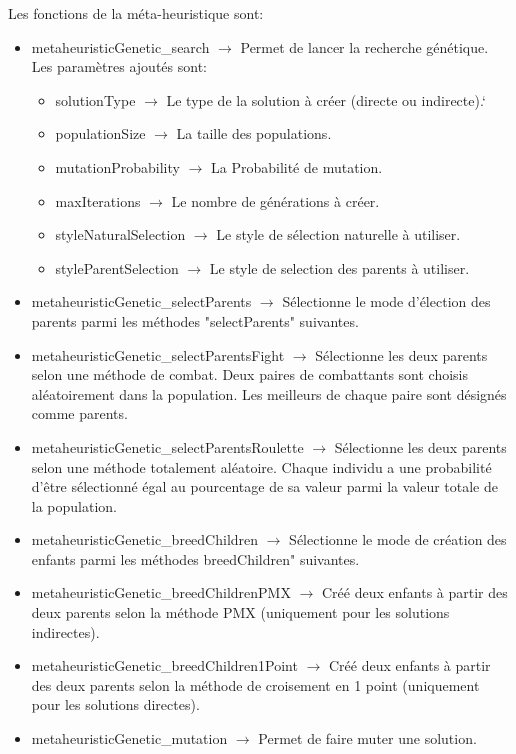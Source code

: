 \documentclass{EPUProjetPeiP}
\begin{document}
Les fonctions de la méta-heuristique sont:
\begin{itemize}
	\item metaheuristicGenetic\_search $\longrightarrow$ Permet de lancer la recherche génétique. Les paramètres ajoutés sont:
	\begin{itemize}
		\item solutionType $\longrightarrow$ Le type de la solution à créer (directe ou indirecte).`
		\item populationSize $\longrightarrow$ La taille des populations.
		\item mutationProbability $\longrightarrow$ La Probabilité de mutation.
		\item maxIterations $\longrightarrow$ Le nombre de générations à créer.
		\item styleNaturalSelection $\longrightarrow$ Le style de sélection naturelle à utiliser.
		\item styleParentSelection $\longrightarrow$ Le style de selection des parents à utiliser.
	\end{itemize}
	\item metaheuristicGenetic\_selectParents $\longrightarrow$ Sélectionne le mode d'élection des parents parmi les méthodes "selectParents" suivantes.
	\item metaheuristicGenetic\_selectParentsFight $\longrightarrow$ Sélectionne les deux parents selon une méthode de combat. Deux paires de combattants sont choisis aléatoirement dans la population. Les meilleurs de chaque paire sont désignés comme parents.
	\item metaheuristicGenetic\_selectParentsRoulette $\longrightarrow$ Sélectionne les deux parents selon une méthode totalement aléatoire. Chaque individu a une probabilité d'être sélectionné égal au pourcentage de sa valeur parmi la valeur totale de la population.
	\item metaheuristicGenetic\_breedChildren $\longrightarrow$ Sélectionne le mode de création des enfants parmi les méthodes breedChildren" suivantes.
	\item metaheuristicGenetic\_breedChildrenPMX $\longrightarrow$ Créé deux enfants à partir des deux parents selon la méthode PMX (uniquement pour les solutions indirectes).
	\item metaheuristicGenetic\_breedChildren1Point $\longrightarrow$ Créé deux enfants à partir des deux parents selon la méthode de croisement en 1 point (uniquement pour les solutions directes).
	\item metaheuristicGenetic\_mutation $\longrightarrow$ Permet de faire muter une solution.

\end{itemize}
\end{document}
